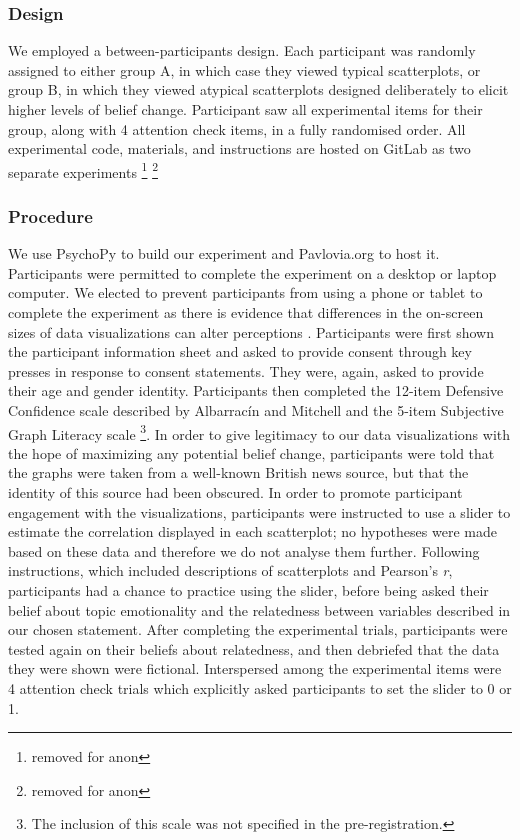 \documentclass[manuscript,screen,review,anonymous]{acmart}
\begin{document}
\subsubsection{Design}\label{sec-design-main}

We employed a between-participants design. Each participant was randomly
assigned to either group A, in which case they viewed typical
scatterplots, or group B, in which they viewed atypical scatterplots
designed deliberately to elicit higher levels of belief change.
Participant saw all experimental items for their group, along with 4
attention check items, in a fully randomised order. All experimental
code, materials, and instructions are hosted on GitLab as two separate
experiments \footnote{removed for anon} \footnote{removed for anon}

\subsubsection{Procedure}\label{sec-procedure-main}

We use PsychoPy \citep{pierce_2019} to build our experiment and
Pavlovia.org to host it. Participants were permitted to complete the
experiment on a desktop or laptop computer. We elected to prevent
participants from using a phone or tablet to complete the experiment as
there is evidence that differences in the on-screen sizes of data
visualizations can alter perceptions \citep{cleveland_1982}.
Participants were first shown the participant information sheet and
asked to provide consent through key presses in response to consent
statements. They were, again, asked to provide their age and gender
identity. Participants then completed the 12-item Defensive Confidence
scale described by Albarracín and Mitchell \citep{albarracin_2004} and
the 5-item Subjective Graph Literacy scale \citep{garcia_2016}
\footnote{The inclusion of this scale was not specified in the
  pre-registration.}. In order to give legitimacy to our data
visualizations with the hope of maximizing any potential belief change,
participants were told that the graphs were taken from a well-known
British news source, but that the identity of this source had been
obscured. In order to promote participant engagement with the
visualizations, participants were instructed to use a slider to estimate
the correlation displayed in each scatterplot; no hypotheses were made
based on these data and therefore we do not analyse them further.
Following instructions, which included descriptions of scatterplots and
Pearson's \emph{r}, participants had a chance to practice using the
slider, before being asked their belief about topic emotionality and the
relatedness between variables described in our chosen statement. After
completing the experimental trials, participants were tested again on
their beliefs about relatedness, and then debriefed that the data they
were shown were fictional. Interspersed among the experimental items
were 4 attention check trials which explicitly asked participants to set
the slider to 0 or 1.
\end{document}

